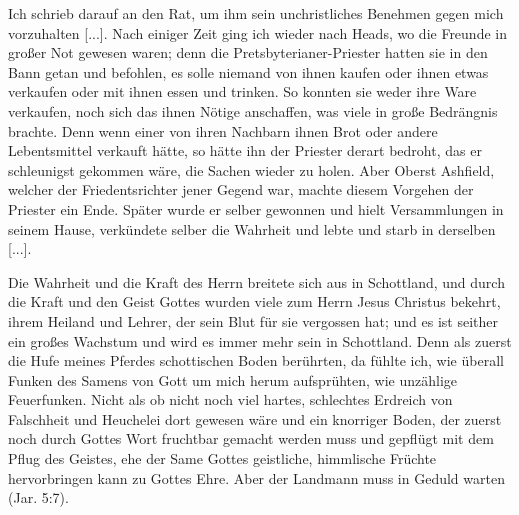 Ich schrieb darauf an den Rat, um ihm sein unchristliches 
Benehmen gegen mich vorzuhalten [...].
Nach einiger Zeit ging ich wieder nach Heads, wo die
Freunde in großer Not gewesen waren; denn die 
Pretsbyterianer-Priester hatten 
sie in den Bann getan und befohlen,
es solle niemand von ihnen kaufen oder ihnen etwas
verkaufen oder mit ihnen essen und trinken. So konnten sie weder
ihre Ware verkaufen, noch sich das ihnen Nötige anschaffen, was
viele in große Bedrängnis brachte. Denn wenn einer von ihren
Nachbarn ihnen Brot oder andere Lebentsmittel verkauft hätte, so
hätte ihn der Priester derart bedroht, das er schleunigst gekommen
wäre, die Sachen wieder zu holen. Aber Oberst 
Ashfield, welcher
der Friedentsrichter jener Gegend war, machte diesem Vorgehen
der Priester ein Ende. Später wurde er selber gewonnen und hielt
Versammlungen in seinem Hause, verkündete selber die Wahrheit
und lebte und starb in derselben [...].


Die Wahrheit und die Kraft des Herrn breitete sich aus in
Schottland, und durch die Kraft und den Geist Gottes wurden
viele zum Herrn Jesus Christus bekehrt, ihrem Heiland und Lehrer,
der sein Blut für sie vergossen hat; und es ist seither ein großes
Wachstum und wird es immer mehr sein in Schottland. Denn
als zuerst die Hufe meines Pferdes schottischen Boden berührten,
da fühlte ich, wie überall Funken des Samens von Gott um mich
herum aufsprühten, wie unzählige Feuerfunken.
Nicht als ob nicht noch viel hartes, schlechtes Erdreich 
von Falschheit und Heuchelei dort gewesen wäre und ein 
knorriger Boden, der zuerst noch durch Gottes Wort fruchtbar 
gemacht werden muss
und gepflügt mit dem Pflug des Geistes, ehe der Same Gottes
geistliche, himmlische Früchte hervorbringen kann zu Gottes Ehre.
Aber der Landmann muss in Geduld warten 
(Jar. 5:7).

